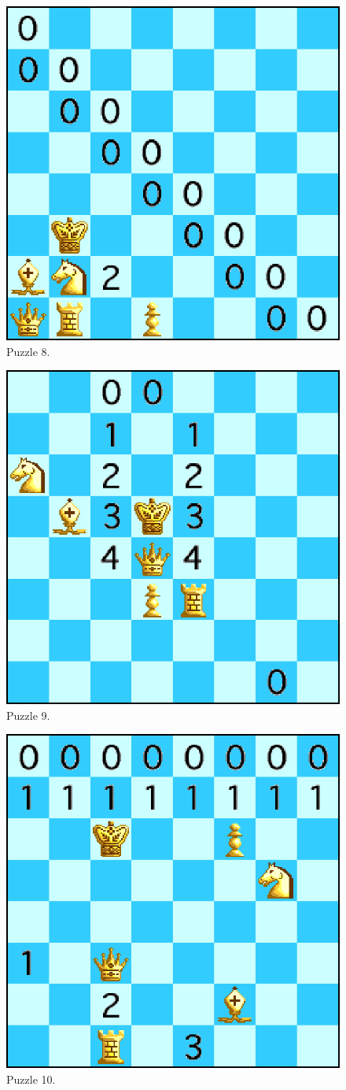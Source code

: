 \documentclass[runningheads]{llncs}
\begin{document}
\begin{figure}[H]
  \centering
  \includegraphics[width=0.6\linewidth]{figures/chess8.eps}
  \caption{Puzzle 8.}\label{fig:puzzle8}
\end{figure}

\begin{figure}[H]
  \centering
  \includegraphics[width=0.6\linewidth]{figures/chess9.eps}
  \caption{Puzzle 9.}\label{fig:puzzle9}
\end{figure}

\begin{figure}[H]
  \centering
  \includegraphics[width=0.6\linewidth]{figures/chess10.eps}
  \caption{Puzzle 10.}\label{fig:puzzle10}
\end{figure}
\end{document}
